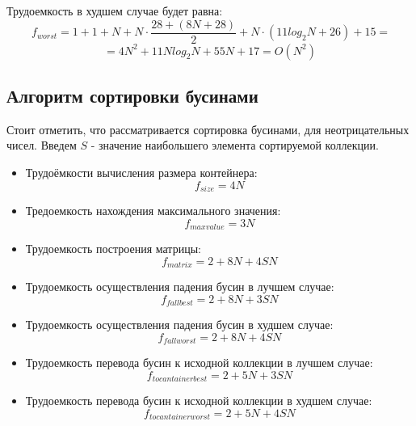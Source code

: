 Трудоемкость в худшем случае будет равна:
\begin{equation}
    \label{for:binary_tree_worst_1}\
    f_{worst} = 1 + 1 + N + N \cdot \frac{28 + (8N + 28)}{2} + N \cdot (11 log_2 N  + 26)  + 15 =
\end{equation}
\begin{equation}
    \label{for:binary_tree_worst_2}
    = 4N^2 + 11 N log_2 N + 55N + 17 = O(N^2)
\end{equation}


\subsection{Алгоритм сортировки бусинами}


Стоит отметить, что рассматривается сортировка бусинами, для
неотрицательных чисел. Введем $S$ - значение наибольшего элемента
сортируемой коллекции.


\begin{itemize}
    \item Трудоёмкости вычисления размера контейнера:
    \begin{equation}
        \label{for:bedads_container_size}
        f_{size} = 4N
    \end{equation}
    \item Тредоемкость нахождения максимального значения:
    \begin{equation}
        \label{for:selection_inner}
        f_{max value} = 3N
    \end{equation}
    \item Трудоемкость построения матрицы:
    \begin{equation}
        \label{for:selection_if}
        f_{matrix} = 2 + 8N + 4SN
    \end{equation}
    \item Трудоемкость осуществления падения бусин в лучшем случае:
    \begin{equation}
        \label{for:fallbest}
        f_{fallbest} = 2 + 8N + 3SN
    \end{equation}
    \item Трудоемкость осуществления падения бусин в худшем случае:
    \begin{equation}
        \label{for:fallworst}
        f_{fallworst} = 2 + 8N + 4SN
    \end{equation}
    \item Трудоемкость перевода бусин к исходной коллекции в лучшем случае:
    \begin{equation}
        \label{for:tocontainerbest}
        f_{tocantainerbest} = 2 + 5N + 3SN
    \end{equation}
    \item Трудоемкость перевода бусин к исходной коллекции в худшем случае:
    \begin{equation}
        \label{for:tocontainerworst}
        f_{tocantainerworst} = 2 + 5N + 4SN
    \end{equation}
\end{itemize}

